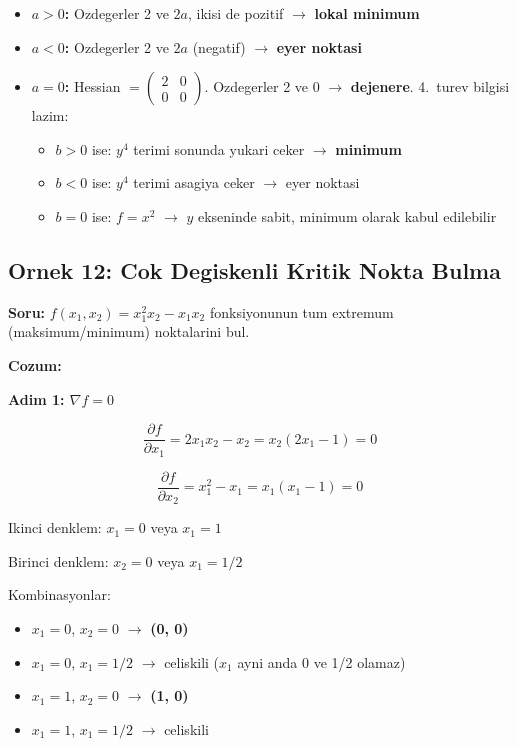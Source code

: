 \documentclass[12pt,a4paper]{article}
\theoremstyle{definition}
\theoremstyle{remark}
\begin{document}
\begin{itemize}[leftmargin=*, itemsep=0.3em]
\item \textbf{$a > 0$:} Ozdegerler 2 ve $2a$, ikisi de pozitif $\rightarrow$ \textbf{lokal minimum}
\item \textbf{$a < 0$:} Ozdegerler 2 ve $2a$ (negatif) $\rightarrow$ \textbf{eyer noktasi}
\item \textbf{$a = 0$:} Hessian $= \begin{pmatrix} 2 & 0 \\ 0 & 0 \end{pmatrix}$. Ozdegerler 2 ve 0 $\rightarrow$ \textbf{dejenere}. 4.\ turev bilgisi lazim:
  \begin{itemize}[leftmargin=*]
  \item $b > 0$ ise: $y^4$ terimi sonunda yukari ceker $\rightarrow$ \textbf{minimum}
  \item $b < 0$ ise: $y^4$ terimi asagiya ceker $\rightarrow$ eyer noktasi
  \item $b = 0$ ise: $f = x^2$ $\rightarrow$ $y$ ekseninde sabit, minimum olarak kabul edilebilir
  \end{itemize}
\end{itemize}

\subsection{Ornek 12: Cok Degiskenli Kritik Nokta Bulma}

\textbf{Soru:} $f(x_1, x_2) = x_1^2 x_2 - x_1 x_2$ fonksiyonunun tum extremum (maksimum/minimum) noktalarini bul.

\bigskip
\textbf{Cozum:}

\textbf{Adim 1: $\nabla f = 0$}

\[
\frac{\partial f}{\partial x_1} = 2x_1 x_2 - x_2 = x_2(2x_1 - 1) = 0
\]

\[
\frac{\partial f}{\partial x_2} = x_1^2 - x_1 = x_1(x_1 - 1) = 0
\]

Ikinci denklem: $x_1 = 0$ veya $x_1 = 1$

Birinci denklem: $x_2 = 0$ veya $x_1 = 1/2$

Kombinasyonlar:
\begin{itemize}[leftmargin=*, itemsep=0.2em]
\item $x_1 = 0$, $x_2 = 0$ $\rightarrow$ \textbf{(0, 0)}
\item $x_1 = 0$, $x_1 = 1/2$ $\rightarrow$ celiskili ($x_1$ ayni anda 0 ve 1/2 olamaz)
\item $x_1 = 1$, $x_2 = 0$ $\rightarrow$ \textbf{(1, 0)}
\item $x_1 = 1$, $x_1 = 1/2$ $\rightarrow$ celiskili
\end{itemize}
\end{document}
